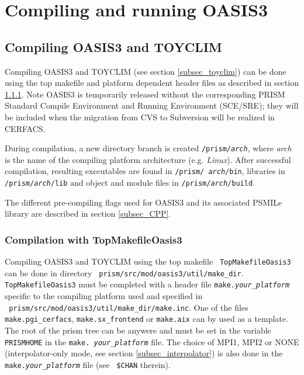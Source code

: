 \newpage
%

\chapter{Compiling and running OASIS3}
\label{sec_compilationrunning}

\section{Compiling OASIS3 and TOYCLIM}
\label{subsec_compile}

Compiling OASIS3 and TOYCLIM (see section \ref{subsec_toyclim})
can be done using the top makefile  and
platform dependent header files as described in section
\ref{sec_notSCE}. Note OASIS3 is temporarily
released without the corresponding PRISM Standard Compile Environment
and Running Environment (SCE/SRE); they will be included when the
migration from CVS to Subversion will be realized in CERFACS.

During compilation, a new directory branch is
created {\tt /prism/{\it arch}}, where {\it arch} is the name of the
compiling platform architecture (e.g. {\it Linux}).  After successful
compilation, resulting executables are found in {\tt /prism/{\it
    arch}/bin}, libraries in {\tt /prism/{\it arch}/lib} and object
and module files in {\tt /prism/{\it arch}/build}.

The different pre-compiling flags used for OASIS3 and its associated
PSMILe library are described in section \ref{subsec_CPP}.

\subsection{Compilation with TopMakefileOasis3}
\label{sec_notSCE}

Compiling OASIS3 and TOYCLIM using the top makefile {\tt
  TopMakefileOasis3} can be done in directory {\tt
  prism/src/mod/oasis3/util/make\_dir}. {\tt TopMakefileOasis3} must
be completed with a header file {\tt make.{\it your\_platform}}
specific to the compiling platform used and specified in \\{\tt
  prism/src/mod/oasis3/util/make\_dir/make.inc}.  One of the files
{\tt make.pgi\_cerfacs}, {\tt make.sx\_frontend} or {\tt make.aix} can
by used as a template.  The root of the prism tree can be anywere and
must be set in the variable {\tt PRISMHOME} in the {\tt make.{\it
    your\_platform}} file. The choice of MPI1, MPI2 or NONE
(interpolator-only mode, see section \ref{subsec_interpolator}) is
also done in the {\tt make.{\it your\_platform}} file (see {\tt
  \$CHAN} therein).

